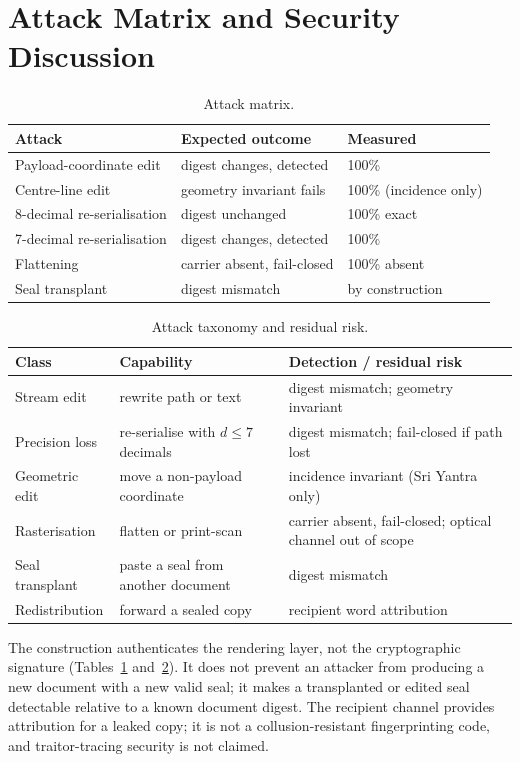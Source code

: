 \documentclass[journal]{IEEEtran}
\begin{document}
\section{Attack Matrix and Security Discussion}\label{sec:security}
\begin{table}[t]
\centering
\footnotesize
\caption{Attack matrix.}
\label{tab:attack}
\begin{tabular}{@{}p{2.0cm}p{2.2cm}p{1.0cm}@{}}
\toprule
Attack & Expected outcome & Measured \\
\midrule
Payload-coordinate edit & digest changes, detected & 100\% \\
Centre-line edit & geometry invariant fails & 100\% (incidence only) \\
8-decimal re-serialisation & digest unchanged & 100\% exact \\
7-decimal re-serialisation & digest changes, detected & 100\% \\
Flattening & carrier absent, fail-closed & 100\% absent \\
Seal transplant & digest mismatch & by construction \\
\bottomrule
\end{tabular}
\end{table}

\begin{table}[t]
\centering
\footnotesize
\caption{Attack taxonomy and residual risk.}
\label{tab:taxonomy}
\begin{tabular}{@{}p{1.55cm}p{1.7cm}p{1.7cm}@{}}
\toprule
Class & Capability & Detection / residual risk \\
\midrule
Stream edit & rewrite path or text & digest mismatch; geometry invariant \\
Precision loss & re-serialise with $d\le7$ decimals & digest mismatch; fail-closed if path lost \\
Geometric edit & move a non-payload coordinate & incidence invariant (Sri Yantra only) \\
Rasterisation & flatten or print-scan & carrier absent, fail-closed; optical channel out of scope \\
Seal transplant & paste a seal from another document & digest mismatch \\
Redistribution & forward a sealed copy & recipient word attribution \\
\bottomrule
\end{tabular}
\end{table}

The construction authenticates the rendering layer, not the cryptographic signature (Tables~\ref{tab:attack} and~\ref{tab:taxonomy}). It does not prevent an attacker from producing a new document with a new valid seal; it makes a transplanted or edited seal detectable relative to a known document digest. The recipient channel provides attribution for a leaked copy; it is not a collusion-resistant fingerprinting code, and traitor-tracing security is not claimed.
\end{document}
